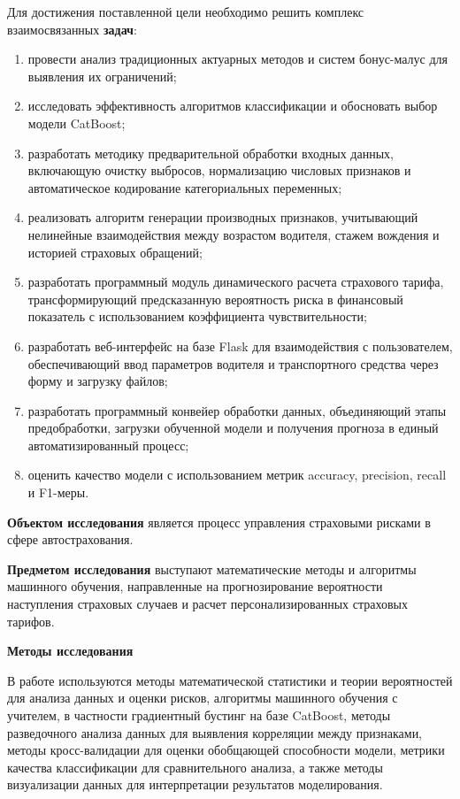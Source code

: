 Для достижения поставленной цели необходимо решить комплекс взаимосвязанных \textbf{задач}:
\begin{enumerate}
    \item провести анализ традиционных актуарных методов и систем бонус-малус для выявления их ограничений;
    \item исследовать эффективность алгоритмов классификации и обосновать выбор модели CatBoost;
    \item разработать методику предварительной обработки входных данных, включающую очистку выбросов, нормализацию числовых признаков и автоматическое кодирование категориальных переменных;
    \item реализовать алгоритм генерации производных признаков, учитывающий нелинейные взаимодействия между возрастом водителя, стажем вождения и историей страховых обращений;
    \item разработать программный модуль динамического расчета страхового тарифа, трансформирующий предсказанную вероятность риска в финансовый показатель с использованием коэффициента чувствительности;
    \item разработать веб-интерфейс на базе Flask для взаимодействия с пользователем, обеспечивающий ввод параметров водителя и транспортного средства через форму и загрузку файлов;
    \item разработать программный конвейер обработки данных, объединяющий этапы предобработки, загрузки обученной модели и получения прогноза в единый автоматизированный процесс;
    \item оценить качество модели с использованием метрик accuracy, precision, recall и F1-меры.
\end{enumerate}

\textbf{Объектом исследования} является процесс управления страховыми рисками в сфере автострахования.

\textbf{Предметом исследования} выступают математические методы и алгоритмы машинного обучения, направленные на прогнозирование вероятности наступления страховых случаев и расчет персонализированных страховых тарифов.

\textbf{Методы исследования} 

В работе используются методы математической статистики и теории вероятностей для анализа данных и оценки рисков, алгоритмы машинного обучения с учителем, в частности градиентный бустинг на базе CatBoost, методы разведочного анализа данных для выявления корреляции между признаками, методы кросс-валидации для оценки обобщающей способности модели, метрики качества классификации для сравнительного анализа, а также методы визуализации данных для интерпретации результатов моделирования.

